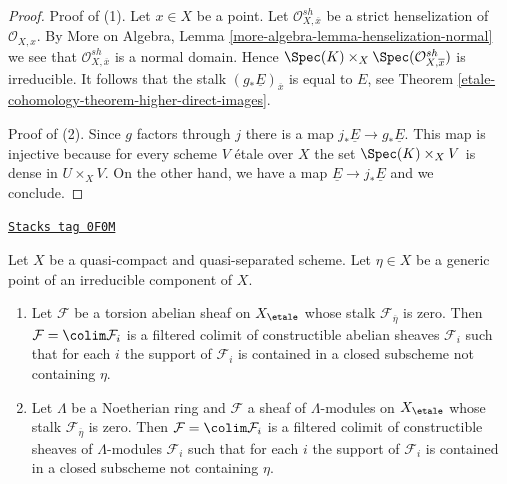 \begin{proof}
Proof of (1). Let $x \in X$ be a point. Let
$\mathcal{O}^{sh}_{X, \overline{x}}$
be a strict henselization of $\mathcal{O}_{X, x}$.
By More on Algebra, Lemma \ref{more-algebra-lemma-henselization-normal}
we see that $\mathcal{O}^{sh}_{X, \overline{x}}$ is a normal domain.
Hence $\Spec(K) \times_X \Spec(\mathcal{O}^{sh}_{X, \overline{x}})$
is irreducible. It follows that
the stalk $(g_*\underline{E})_{\overline{x}}$ is equal to $E$,
see Theorem \ref{etale-cohomology-theorem-higher-direct-images}.

\medskip\noindent
Proof of (2). Since $g$ factors through $j$ there is a map
$j_*\underline{E} \to g_*\underline{E}$. This map is injective because
for every scheme $V$ \'etale over $X$ the set $\Spec(K) \times_X V$
is dense in $U \times_X V$. On the other hand, we have a map
$\underline{E} \to j_*\underline{E}$ and we conclude.
\end{proof}

\begin{lemma}
\label{etale-cohomology-lemma-zero-in-generic-point}
\href{https://stacks.math.columbia.edu/tag/0F0M}{\texttt{Stacks tag 0F0M}}

Let $X$ be a quasi-compact and quasi-separated scheme. Let
$\eta \in X$ be a generic point of an irreducible component of $X$.
\begin{enumerate}
\item Let $\mathcal{F}$ be a torsion abelian sheaf on $X_\etale$
whose stalk $\mathcal{F}_{\overline{\eta}}$ is zero.
Then $\mathcal{F} = \colim \mathcal{F}_i$ is a filtered colimit of
constructible abelian sheaves $\mathcal{F}_i$ such that for each $i$
the support of $\mathcal{F}_i$ is contained
in a closed subscheme not containing $\eta$.
\item Let $\Lambda$ be a Noetherian ring and $\mathcal{F}$ a sheaf
of $\Lambda$-modules on $X_\etale$ whose stalk
$\mathcal{F}_{\overline{\eta}}$ is zero. Then
$\mathcal{F} = \colim \mathcal{F}_i$
is a filtered colimit of constructible sheaves of
$\Lambda$-modules $\mathcal{F}_i$ such that for each $i$
the support of $\mathcal{F}_i$ is contained in a closed subscheme
not containing $\eta$.
\end{enumerate}
\end{lemma}

